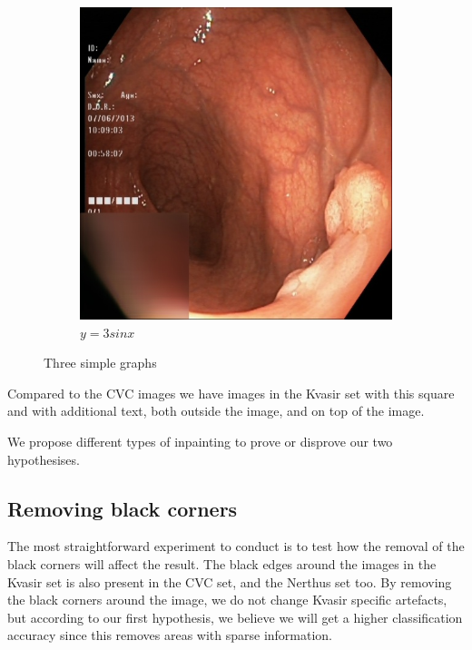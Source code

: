 \begin{figure}
\begin{subfigure}[b]{0.5\textwidth}
         \includegraphics[width=\textwidth]{experiments/figures/nogreenframe.jpg}
         \caption{$y=3sinx$}
         \label{fig:three sin x}
     \end{subfigure}
        \caption{Three simple graphs}
        \label{fig:three graphs}
\end{figure}



Compared to the CVC images we have images in the Kvasir set with this square and with additional text, both outside the image, and on top of the image.  

We propose different types of inpainting to prove or disprove our two hypothesises.

\subsection{Removing black corners}
The most straightforward experiment to conduct is to test how the removal of the black corners will affect the result. 
The black edges around the images in the Kvasir set is also present in the CVC set, and the Nerthus set too. By removing the black corners around the image, we do not change Kvasir specific artefacts, but according to our first hypothesis, we believe we will get a higher classification accuracy since this removes areas with sparse information.

